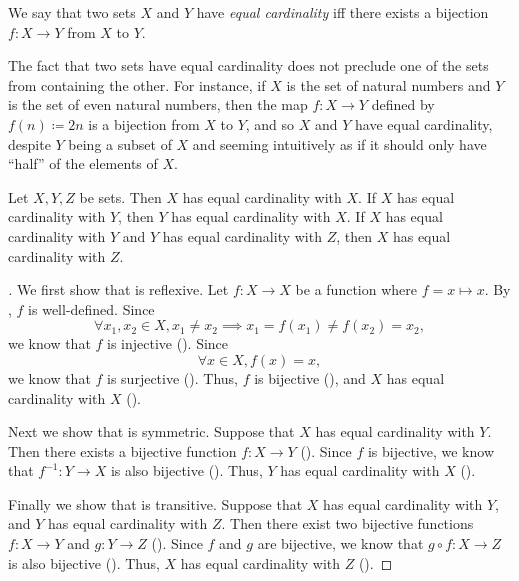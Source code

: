 \begin{defn}\label{i:3.6.1}
  We say that two sets \(X\) and \(Y\) have \emph{equal cardinality} iff there exists a bijection \(f : X \to Y\) from \(X\) to \(Y\).
\end{defn}

\setcounter{thm}{2}
\begin{rmk}\label{i:3.6.3}
  The fact that two sets have equal cardinality does not preclude one of the sets from containing the other.
  For instance, if \(X\) is the set of natural numbers and \(Y\) is the set of even natural numbers, then the map \(f : X \to Y\) defined by \(f(n) \coloneqq 2n\) is a bijection from \(X\) to \(Y\), and so \(X\) and \(Y\) have equal cardinality, despite \(Y\) being a subset of \(X\) and seeming intuitively as if it should only have ``half'' of the elements of \(X\).
\end{rmk}

\begin{prop}\label{i:3.6.4}
  Let \(X, Y, Z\) be sets.
  Then \(X\) has equal cardinality with \(X\).
  If \(X\) has equal cardinality with \(Y\), then \(Y\) has equal cardinality with \(X\).
  If \(X\) has equal cardinality with \(Y\) and \(Y\) has equal cardinality with \(Z\), then \(X\) has equal cardinality with \(Z\).
\end{prop}

\begin{proof}[]
  We first show that  is reflexive.
  Let \(f : X \to X\) be a function where \(f = x \mapsto x\).
  By , \(f\) is well-defined.
  Since
  \[
    \forall x_1, x_2 \in X, x_1 \neq x_2 \implies x_1 = f(x_1) \neq f(x_2) = x_2,
  \]
  we know that \(f\) is injective ().
  Since
  \[
    \forall x \in X, f(x) = x,
  \]
  we know that \(f\) is surjective ().
  Thus, \(f\) is bijective (), and \(X\) has equal cardinality with \(X\) ().

  Next we show that  is symmetric.
  Suppose that \(X\) has equal cardinality with \(Y\).
  Then there exists a bijective function \(f : X \to Y\) ().
  Since \(f\) is bijective, we know that \(f^{-1} : Y \to X\) is also bijective ().
  Thus, \(Y\) has equal cardinality with \(X\) ().

  Finally we show that  is transitive.
  Suppose that \(X\) has equal cardinality with \(Y\), and \(Y\) has equal cardinality with \(Z\).
  Then there exist two bijective functions \(f : X \to Y\) and \(g : Y \to Z\) ().
  Since \(f\) and \(g\) are bijective, we know that \(g \circ f : X \to Z\) is also bijective ().
  Thus, \(X\) has equal cardinality with \(Z\) ().
\end{proof}

